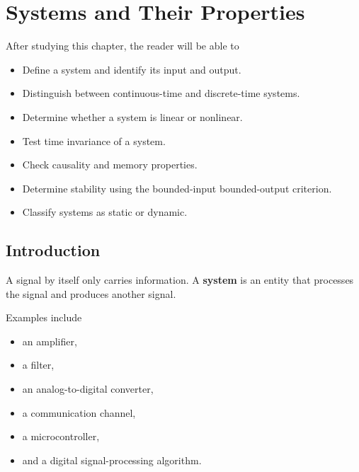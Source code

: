 
\chapter{Systems and Their Properties}

\begin{tcolorbox}[colback=blue!5!white,colframe=blue!70!black,title=Learning Objectives]

After studying this chapter, the reader will be able to

\begin{itemize}
\item Define a system and identify its input and output.
\item Distinguish between continuous-time and discrete-time systems.
\item Determine whether a system is linear or nonlinear.
\item Test time invariance of a system.
\item Check causality and memory properties.
\item Determine stability using the bounded-input bounded-output criterion.
\item Classify systems as static or dynamic.
\end{itemize}

\end{tcolorbox}


\section{Introduction}

A signal by itself only carries information. A \textbf{system} is an entity that
processes the signal and produces another signal.

Examples include

\begin{itemize}
\item an amplifier,
\item a filter,
\item an analog-to-digital converter,
\item a communication channel,
\item a microcontroller,
\item and a digital signal-processing algorithm.
\end{itemize}

